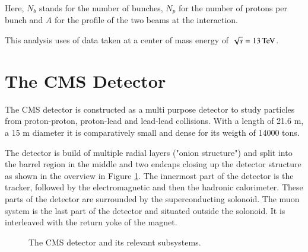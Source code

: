 Here, $N_b$ stands for the number of bunches, $N_p$ for the number of protons per bunch and $A$ for the profile of the two beams at the interaction.

This analysis uses \lumiv of data taken at a center of mass energy of $\sqrt{s} = 13 \,\text{Te\hspace{-.08em}V}$.

\section{The CMS Detector}

The CMS detector is constructed as a multi purpose detector to study particles from proton-proton, proton-lead and lead-lead collisions.
With a length of 21.6 m, a 15 m diameter it is comparatively small and dense for its weigth of 14000 tons.

The detector is build of multiple radial layers ("onion structure") and split into the barrel region in the middle and two endcaps closing up the detector structure as shown in the overview in Figure \ref{fig:det_CMS}.
The innermost part of the detector is the tracker, followed by the electromagnetic and then the hadronic calorimeter.
These parts of the detector are surrounded by the superconducting solonoid. The muon system is the last part of the detector and situated outside the solonoid. It is interleaved with the return yoke of the magnet.

\begin{figure}[htbp!]
  \begin{center}

\caption{The CMS detector and its relevant subsystems. \cite{Collaboration:1433717}
  \label{fig:det_CMS}}
  \end{center}
\end{figure}


